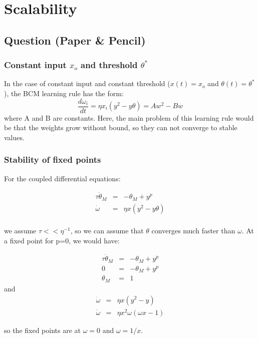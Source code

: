 \section{Scalability}

\subsection{Question (Paper \& Pencil)}     %

\subsubsection{Constant input $x_o$ and threshold $\theta^*$}       %
In the case of constant input and constant threshold ($x(t)=x_o$ and $\theta(t) = \theta^*$), the BCM learning rule has the form: 
\begin{equation}
\frac{d\omega_i}{dt} = \eta x_i(y^2-y\theta)= Aw^2-Bw
\end{equation}
where A and B are constants. Here, the main problem of this learning rule would be that the weights grow without bound, so they can not converge to stable values.  
\subsubsection{Stability of fixed points}
For the coupled differential equations: 

\begin{eqnarray}
\tau \dot \theta_M &=&  -\theta_M + y^p \\
\dot \omega &=& \eta x (y^2-y\theta) \\
\end{eqnarray}

we assume $\tau << \eta^{-1}$, so we can assume that $\theta$ converges much faster than $\omega$. At a fixed point for p=0, we would have: 

\begin{eqnarray}
\tau \dot \theta_M &=&  -\theta_M + y^p \\
0 &=& -\theta_M + y^p \\
\theta_M &=& 1
\end{eqnarray}
and 
\begin{eqnarray}
\dot \omega &=& \eta x (y^2-y) \\
\dot \omega &=& \eta x^2 \omega (\omega x- 1) 
\end{eqnarray}

so the fixed points are at $\omega = 0$ and $\omega = 1/x$. 
